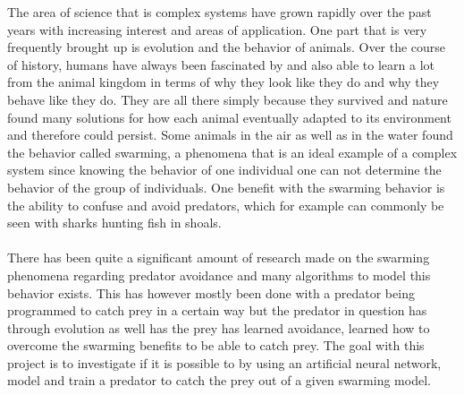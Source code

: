 The area of science that is complex systems have grown rapidly over the past years with increasing interest and areas of application. One part that is very frequently brought up is evolution and the behavior of animals. Over the course of history, humans have always been fascinated by and also able to learn a lot from the animal kingdom in terms of why they look like they do and why they behave like they do. They are all there simply because they survived and nature found many solutions for how each animal eventually adapted to its environment and therefore could persist. Some animals in the air as well as in the water found the behavior called swarming, a phenomena that is an ideal example of a complex system since knowing the behavior of one individual one can not determine the behavior of the group of individuals. One benefit with the swarming behavior is the ability to confuse and avoid predators, which for example can commonly be seen with sharks hunting fish in shoals.\\
\\
There has been quite a significant amount of research made on the swarming phenomena regarding predator avoidance and many algorithms to model this behavior exists. This has however mostly been done with a predator being programmed to catch prey in a certain way but the predator in question has through evolution as well has the prey has learned avoidance, learned how to overcome the swarming benefits to be able to catch prey. The goal with this project is to investigate if it is possible to by using an artificial neural network, model and train a predator to catch the prey out of a given swarming model.


